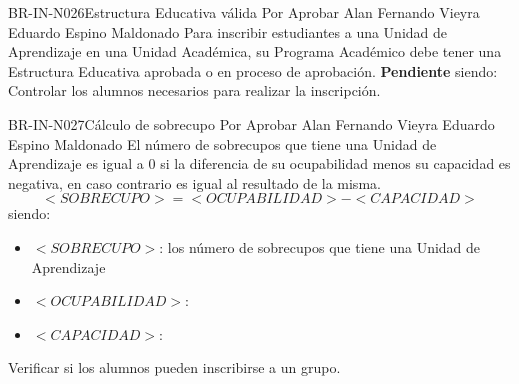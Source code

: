 \begin{BusinessRule}{BR-IN-N026}{Estructura Educativa válida}
	{\bcCondition}    %
	{\btEnabler}     %
	{\blControlling}    %
	\BRItem[Estado] Por Aprobar
	 Alan Fernando Vieyra
	 Eduardo Espino Maldonado
	\BRItem[Descripción] Para inscribir estudiantes a una Unidad de Aprendizaje en una Unidad Académica, su Programa Académico debe tener una Estructura Educativa aprobada o en proceso de aprobación.
	\BRItem[Sentencia] \textbf{Pendiente}
	siendo:
	\BRItem[Motivación] Controlar los alumnos necesarios para realizar la inscripción.
\end{BusinessRule}

\begin{BusinessRule}{BR-IN-N027}{Cálculo de sobrecupo}
	{\bcCondition}    %
	{\btTimer}     %
	{\blControlling}    %
	\BRItem[Estado] Por Aprobar
	 Alan Fernando Vieyra
	 Eduardo Espino Maldonado
	\BRItem[Descripción] El número de sobrecupos que tiene una Unidad de Aprendizaje es igual a 0 si la diferencia de su ocupabilidad menos su capacidad es negativa, en caso contrario es igual al resultado de la misma.
	\BRItem[Sentencia] $$<SOBRECUPO> = <OCUPABILIDAD> - <CAPACIDAD>$$
	siendo:
		\begin{itemize}
			\item $<SOBRECUPO>$: los número de sobrecupos que tiene una Unidad de Aprendizaje
			\item $<OCUPABILIDAD>$:   
			\item $<CAPACIDAD>$: 
		\end{itemize}
	\BRItem[Motivación] Verificar si los alumnos pueden inscribirse a un grupo.
\end{BusinessRule}

